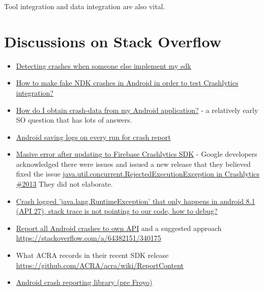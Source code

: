 Tool integration and data integration are also vital.


\section{Discussions on Stack Overflow}
\begin{itemize}
    \item \href{https://stackoverflow.com/questions/66471628/detecting-crashes-when-someone-else-implement-my-sdk}{Detecting crashes when someone else implement my sdk}
    \item \href{https://stackoverflow.com/questions/67138663/how-to-make-fake-ndk-crashes-in-android-in-order-to-test-crashlytics-integration}{How to make fake NDK crashes in Android in order to test Crashlytics integration?}
    \item \href{How do I obtain crash-data from my Android application?}{How do I obtain crash-data from my Android application?} - a relatively early SO question that has lots of answers.
    \item \href{https://stackoverflow.com/questions/20763011/android-saving-logs-on-every-run-for-crash-report}{Android saving logs on every run for crash report}
    \item \href{https://stackoverflow.com/questions/63190868/masive-error-after-updating-to-firebase-crashlytics-sdk}{Masive error after updating to Firebase Crashlytics SDK} - Google developers acknowledged there were issues and issued a new release that they believed fixed the issue \href{https://github.com/firebase/firebase-android-sdk/issues/2013}{java.util.concurrent.RejectedExecutionException in Crashlytics \#2013} They did not elaborate.
    \item \href{https://stackoverflow.com/questions/64381093/crash-logged-java-lang-runtimeexception-that-only-happens-in-android-8-1-api}{Crash logged 'java.lang.RuntimeException' that only happens in android 8.1 (API 27), stack trace is not pointing to our code, how to debug?}
    \item \href{https://stackoverflow.com/questions/59926756/report-all-android-crashes-to-own-api}{Report all Android crashes to own API} and a suggested approach \url{https://stackoverflow.com/a/64382151/340175}
    \item What ACRA records in their recent SDK release \url{https://github.com/ACRA/acra/wiki/ReportContent}
    \item \href{https://stackoverflow.com/questions/3378550/android-crash-reporting-library-pre-froyo}{Android crash reporting library (pre Froyo)}

\end{itemize}
